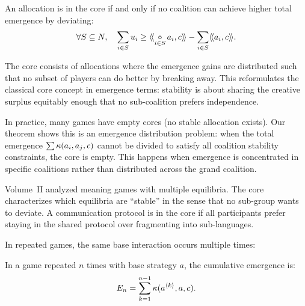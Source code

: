 \begin{theorem}
\label{thm:core-stability}
An allocation is in the core if and only if no coalition can achieve higher
total emergence by deviating:
\[
  \forall S \subseteq N, \quad \sum_{i \in S} u_i \geq
  \langle\!\langle \mathop{\circ}\limits_{i \in S} a_i, c \rangle\!\rangle - \sum_{i \in S} \langle\!\langle a_i, c \rangle\!\rangle.
\]
\end{theorem}

\begin{interpretation}
The core consists of allocations where the emergence gains are distributed such
that no subset of players can do better by breaking away. This reformulates the
classical core concept in emergence terms: stability is about sharing the
creative surplus equitably enough that no sub-coalition prefers independence.

In practice, many games have empty cores (no stable allocation exists). Our
theorem shows this is an emergence distribution problem: when the total emergence
$\sum \kappa(a_i, a_j, c)$ cannot be divided to satisfy all coalition stability
constraints, the core is empty. This happens when emergence is concentrated in
specific coalitions rather than distributed across the grand coalition.

Volume~II analyzed meaning games with multiple equilibria. The core characterizes
which equilibria are ``stable'' in the sense that no sub-group wants to deviate.
A communication protocol is in the core if all participants prefer staying in
the shared protocol over fragmenting into sub-languages.
\end{interpretation}



In repeated games, the same base interaction occurs multiple times:

\begin{theorem}
\label{thm:repeated-game-emergence}
In a game repeated $n$ times with base strategy $a$, the cumulative emergence is:
\[
  E_n = \sum_{k=1}^{n-1} \kappa(a^{\langle k \rangle}, a, c).
\]
\end{theorem}

